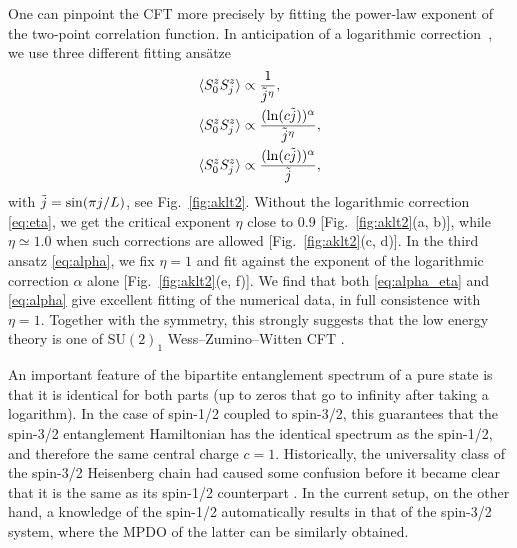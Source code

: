\documentclass[twocolumn,aps,prb,english]{revtex4-2}
\begin{document}
One can pinpoint the CFT more precisely by fitting the power-law exponent of the two-point correlation function. In anticipation of a logarithmic correction~\cite{Giamarchi2003}, we use three different fitting ans\"atze
\begin{align}
&\langle S_0^z S_j^z\rangle\propto\frac{1}{\Tilde{j}^\eta}, \label{eq:eta}\\
&\langle S_0^z S_j^z\rangle\propto\frac{(\ln(c\Tilde{j}))^\alpha}{\Tilde{j}^\eta}, \label{eq:alpha_eta} \\ 
&\langle S_0^z S_j^z\rangle\propto\frac{(\ln(c\Tilde{j}))^\alpha}{\Tilde{j}}, \label{eq:alpha}
\end{align}
with $\Tilde{j}=\sin(\pi j/L)$, see Fig.~\ref{fig:aklt2}. Without the logarithmic correction \eqref{eq:eta}, we get the critical exponent $\eta$ close to 0.9 [Fig.~\ref{fig:aklt2}(a, b)], while $\eta\simeq1.0$ when such corrections are allowed [Fig.~\ref{fig:aklt2}(c, d)]. In the third ansatz \eqref{eq:alpha}, we fix $\eta=1$ and fit against the exponent of the logarithmic correction $\alpha$ alone [Fig.~\ref{fig:aklt2}(e, f)]. We find that both \eqref{eq:alpha_eta} and \eqref{eq:alpha} give excellent fitting of the numerical data, in full consistence with $\eta=1$. Together with the symmetry, this strongly suggests that the low energy theory is one of SU$(2)_1$ Wess--Zumino--Witten CFT \cite{Francesco1997}.

An important feature of the bipartite entanglement spectrum of a pure state is that it is identical for both parts (up to zeros that go to infinity after taking a logarithm). In the case of spin-1/2 coupled to spin-3/2, this guarantees that the spin-3/2 entanglement Hamiltonian has the identical spectrum as the spin-1/2, and therefore the same central charge $c=1$. Historically, the universality class of the spin-3/2 Heisenberg chain had caused some confusion before it became clear that it is the same as its spin-1/2 counterpart \cite{Affleck1986b,Affleck1987b,Affleck1989,Hallberg1996}. In the current setup, on the other hand, a knowledge of the spin-1/2 automatically results in that of the spin-3/2 system, where the MPDO of the latter can be similarly obtained.
\end{document}
